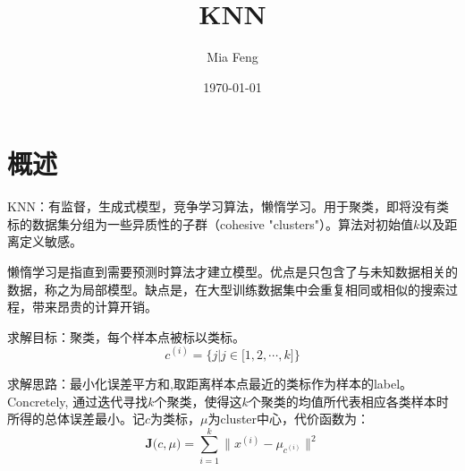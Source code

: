 \documentclass{ctexart}
\title{KNN} %
\author{Mia Feng} %
\date{\today} %
\begin{document}
\maketitle %




\section{概述}
KNN：有监督，生成式模型，竞争学习算法，懒惰学习。用于聚类，即将没有类标的数据集分组为一些异质性的子群（cohesive "clusters"）\cite{stanf:cs229}。算法对初始值$k$以及距离定义敏感。

懒惰学习是指直到需要预测时算法才建立模型。优点是只包含了与未知数据相关的数据，称之为局部模型。缺点是，在大型训练数据集中会重复相同或相似的搜索过程，带来昂贵的计算开销。

求解目标：聚类，每个样本点被标以类标。
\begin{equation}
c^{\left(i\right)} = \big\{j|j\in\big[ 1,2,\cdots,k \big]\big\}
\end{equation}

求解思路：最小化误差平方和,取距离样本点最近的类标作为样本的label。Concretely, 通过迭代寻找$k$个聚类，使得这$k$个聚类的均值所代表相应各类样本时所得的总体误差最小。记$c$为类标，$\mu$为cluster中心，代价函数为\cite{kmeans:implement}：
\begin{equation}
\boldsymbol{J}\big(c,\mu \big)=\sum\limits_{i=1}^{k}\big\| x^{\left(i\right)}-\mu_{c^{\left(i\right)}}\big\|^2
\end{equation}
\end{document}
